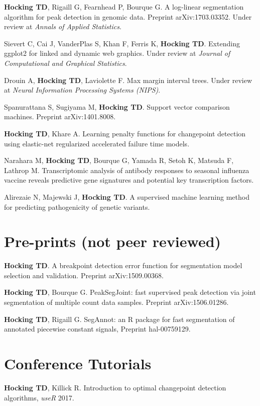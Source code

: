 \documentclass[margin,line]{res}
\begin{document}
\begin{resume}
{\bf Hocking TD}, Rigaill G, Fearnhead P, Bourque G. A log-linear
segmentation algorithm for peak detection in genomic data. Preprint
arXiv:1703.03352. Under review at {\it Annals of Applied Statistics}.

Sievert C, Cai J, VanderPlas S, Khan F, Ferris K, {\bf Hocking
  TD}. Extending ggplot2 for linked and dynamic web graphics. Under
review at {\it Journal of Computational and Graphical Statistics}.

Drouin A, {\bf Hocking TD}, Laviolette F. Max margin interval
trees. Under review at {\it Neural Information Processing Systems (NIPS)}.

Spanurattana S, Sugiyama M, {\bf Hocking TD}. Support vector
comparison machines. Preprint arXiv:1401.8008. 

{\bf Hocking TD}, Khare A. Learning penalty functions for changepoint
detection using elastic-net regularized accelerated failure time
models.

Narahara M, {\bf Hocking TD}, Bourque G, Yamada R, Setoh K, Matsuda F,
Lathrop M. Transcriptomic analysis of antibody responses to seasonal
influenza vaccine reveals predictive gene signatures and potential key
transcription factors.

Alirezaie N, Majewski J, {\bf Hocking TD}. A supervised machine
learning method for predicting pathogenicity of genetic variants.

\section{\sc Pre-prints (not peer reviewed)}

{\bf Hocking TD}. A breakpoint detection error function for
segmentation model selection and validation. Preprint
arXiv:1509.00368.

{\bf Hocking TD}, Bourque G. PeakSegJoint: fast supervised peak
detection via joint segmentation of multiple count data
samples. Preprint arXiv:1506.01286.

{\bf Hocking TD}, Rigaill G. SegAnnot: an R package for fast
segmentation of annotated piecewise constant signals, Preprint
hal-00759129.

\section{\sc Conference Tutorials}

{\bf Hocking TD}, Killick R. Introduction to optimal changepoint detection algorithms, {\it useR} 2017.


\end{resume}
\end{document}

